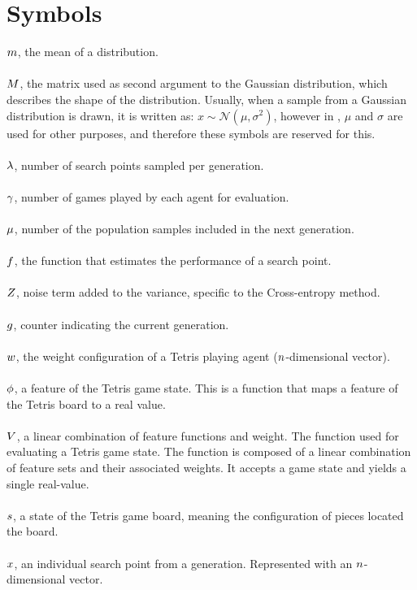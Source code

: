 \clearpage
\section*{Symbols}

$m$, the mean of a distribution.\\
\\
$M$, the matrix used as 
second argument to the Gaussian distribution, 
which describes the shape of the distribution. 
Usually, when a sample from a Gaussian distribution 
is drawn, it is written as: 
$x \sim \mathcal{N} \left( \mu, \sigma^{2} \right)$, 
however in \citep{hansen2011},
$\mu$ and $\sigma$ are used for other 
purposes, and therefore these symbols are reserved for this.\\
\\
$\lambda$, number of search points sampled per generation.\\
\\
$\gamma$, number of games played by each agent for evaluation.\\
\\
$\mu$, number of the population samples included in the next generation.\\
\\
$f$, the function that estimates the performance of a search point.\\
\\
$Z$, noise term added to the variance, specific to the Cross-entropy method.\\
\\
$g$, counter indicating the current generation.\\
\\
$w$, the weight configuration of a Tetris playing agent ($n $-dimensional vector).\\
\\
$\phi$, a feature of the Tetris game state. This is a function that maps a 
feature of the Tetris board to a real value.\\
\\
$V$, a linear combination of feature functions and weight. 
The function used for evaluating a Tetris game state. 
The function is composed of a linear combination of feature sets and their
associated weights. It accepts a game state and yields a single real-value.\\
\\
$s$, a state of the Tetris game board, meaning the
configuration of pieces located the board.\\
\\
$x$, an individual search point from a generation. 
Represented with an $n$-dimensional vector.

\clearpage

